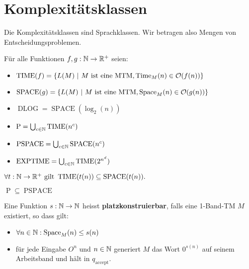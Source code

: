\section{Komplexitätsklassen}
Die Komplexitätsklassen sind Sprachklassen. Wir betragen also Mengen von Entscheidungsproblemen.

\begin{definition}
Für alle Funktionen \(f, g: \mathbb{N} \to \mathbb{R}^+\) seien:
\begin{itemize}
  \item \( \operatorname{TIME}(f) = \{ L(M) \ |\ M \text{ ist eine MTM}, \Time_M(n) \in \mathcal{O}(f(n)) \} \)
  \item \( \operatorname{SPACE}(g) = \{ L(M) \ |\ M \text{ ist eine MTM}, \Space_M(n) \in \mathcal{O}(g(n)) \} \)
  \item \( \operatorname{DLOG} = \operatorname{SPACE}(\log_2(n)) \)
  \item \( \operatorname{P} = \bigcup_{c \in \mathbb{N}} \operatorname{TIME}(n^c) \)
  \item \( \operatorname{PSPACE} = \bigcup_{c \in \mathbb{N}} \operatorname{SPACE}(n^c) \)
  \item \( \operatorname{EXPTIME} = \bigcup_{c \in \mathbb{N}} \operatorname{TIME}(2^{n^d}) \)\\
\end{itemize}
\end{definition}

\begin{lemma}
\(
  \forall t: \mathbb{N} \to \mathbb{R}^+ \text{ gilt } \operatorname{TIME}(t(n)) \subseteq \operatorname{SPACE}(t(n)).
\)\\
\end{lemma}

\begin{corollary}
\( \operatorname{P} \subseteq \operatorname{PSPACE} \)\\
\end{corollary}

\begin{definition}
Eine Funktion \(s: \mathbb{N} \to \mathbb{N}\) heisst \textbf{platzkonstruierbar}, falls eine 1-Band-TM \(M\) existiert, so dass gilt:
\begin{itemize}
  \item \(\forall n \in \mathbb{N}: \operatorname{Space}_M(n) \leq s(n)\)
  \item für jede Eingabe \(O^n\) und \(n \in \mathbb{N}\) generiert \(M\) das Wort \(0^{s(n)}\) auf seinem Arbeitsband und hält in \(q_\text{accept}\).\\
\end{itemize}
\end{definition}

